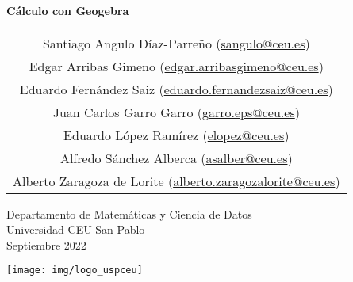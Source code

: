 \begin{titlepage}
\thispagestyle{empty}
\vspace*{7cm}
\par

\begin{center}
\normalfont\fontsize{30}{30}\selectfont
{\bfseries \color{blueceu}Cálculo con Geogebra}
\end{center}
\vspace{1cm}

\begin{center}
\Large
\begin{tabular}{c}
Santiago Angulo Díaz-Parreño (\url{sangulo@ceu.es})\\
Edgar Arribas Gimeno (\url{edgar.arribasgimeno@ceu.es})\\
Eduardo Fernández Saiz (\url{eduardo.fernandezsaiz@ceu.es})\\
Juan Carlos Garro Garro (\url{garro.eps@ceu.es})\\
Eduardo López Ramírez (\url{elopez@ceu.es})\\
Alfredo Sánchez Alberca (\url{asalber@ceu.es})\\
Alberto Zaragoza de Lorite (\url{alberto.zaragozalorite@ceu.es})

\end{tabular}

\medskip 
Departamento de Matemáticas y Ciencia de Datos\\ Universidad CEU San Pablo\\[1cm]
\medskip 
Septiembre 2022

\vspace{1cm}
\texttt{[image: img/logo\_uspceu]}
\end{center}
\vfill
\end{titlepage}